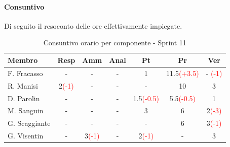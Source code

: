 \documentclass[a4paper,12pt]{article}
\begin{document}
\paragraph{Consuntivo}
Di seguito il resoconto delle ore effettivamente impiegate.
\begin{table}[H]
    \centering
    \renewcommand{\arraystretch}{1.4}
    \footnotesize
    \begin{tabularx}{\textwidth}{|l|C|C|C|C|C|C|}
        \hline
        \textbf{Membro} & \textbf{Resp} & \textbf{Amm} & \textbf{Anal} & \textbf{Pt} & \textbf{Pr} & \textbf{Ver} \\
        \hline
        F. Fracasso & - & - & - & 1 & 11.5\textcolor{red}{(+3.5)} & - \textcolor{red}{(-1)} \\
        \hline
        R. Manisi & 2\textcolor{red}{(-1)} & - & - & - & 10 & 3 \\
        \hline
        D. Parolin & - & - & - & 1.5\textcolor{red}{(-0.5)} & 5.5\textcolor{red}{(-0.5)} & 1 \\
        \hline
        M. Sanguin & - & - & - & 3 & 6 & 2\textcolor{red}{(-3)} \\
        \hline
        G. Scaggiante & - & - & - & - & 6 & 3\textcolor{red}{(-1)} \\
        \hline
        G. Visentin & - & 3\textcolor{red}{(-1)} & - & 2\textcolor{red}{(-1)} & - & 3 \\
        \hline
    \end{tabularx}
    \caption{Consuntivo orario per componente - Sprint 11}
    \label{tab:consuntivo_sprint11}
\end{table}
\end{document}
